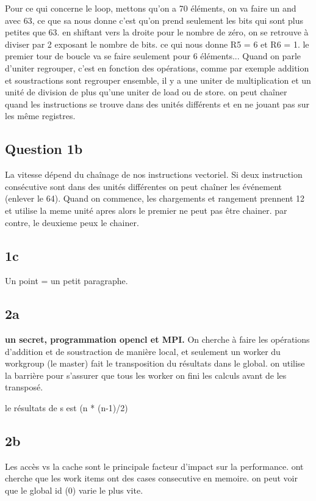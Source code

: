 \documentclass[oneside]{book}
\begin{document}
Pour ce qui concerne le loop, mettons qu'on a 70 éléments, on va faire un and avec 63, ce que sa nous donne c'est qu'on prend seulement les bits qui sont plus petites que 63. en shiftant vers la droite pour le nombre de zéro, on se retrouve à diviser par 2 exposant le nombre de bits. ce qui nous donne R5 = 6 et R6 = 1. le premier tour de boucle va se faire seulement pour 6 éléments... Quand on parle d'uniter regrouper, c'est en fonction des opérations, comme par exemple addition et soustractions sont regrouper ensemble, il y a une uniter de multiplication et un unité de division de plus qu'une uniter de load ou de store. on peut chaîner quand les instructions se trouve dans des unités différents et en ne jouant pas sur les même registres.

\subsection{Question 1b}

La vitesse dépend du chaînage de nos instructions vectoriel. Si deux instruction consécutive sont dans des unités différentes on peut chaîner les événement (enlever le 64). Quand on commence, les chargements et rangement prennent 12 et utilise la meme unité apres alors le premier ne peut pas être chainer. par contre, le deuxieme peux le chainer. 

\subsection{1c}
Un point = un petit paragraphe. 

\subsection{2a}
\textbf{un secret, programmation opencl et MPI.}  
On cherche à faire les opérations d'addition et de soustraction de manière local, et seulement un worker du workgroup (le master) fait le transposition du résultats dans le global. on utilise la barrière pour s'assurer que tous les worker on fini les calculs avant de les transposé.

le résultats de s est (n * (n-1)/2)
\subsection{2b}
Les accès vs la cache sont le principale facteur d'impact sur la performance.  ont cherche que les work items ont des cases consecutive en memoire. on peut voir que le global id (0) varie le plus vite. \\
\end{document}

